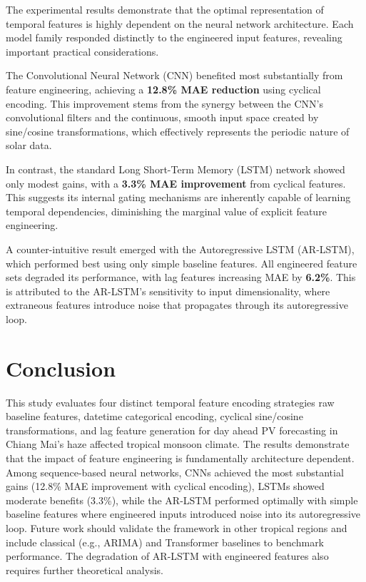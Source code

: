 \documentclass[conference]{IEEEtran}
\begin{document}
The experimental results demonstrate that the optimal representation of temporal features is highly dependent on the neural network architecture. Each model family responded distinctly to the engineered input features, revealing important practical considerations.

The Convolutional Neural Network (CNN) benefited most substantially from feature engineering, achieving a \textbf{12.8\% MAE reduction} using cyclical encoding. This improvement stems from the synergy between the CNN's convolutional filters and the continuous, smooth input space created by sine/cosine transformations, which effectively represents the periodic nature of solar data.

In contrast, the standard Long Short-Term Memory (LSTM) network showed only modest gains, with a \textbf{3.3\% MAE improvement} from cyclical features. This suggests its internal gating mechanisms are inherently capable of learning temporal dependencies, diminishing the marginal value of explicit feature engineering.

A counter-intuitive result emerged with the Autoregressive LSTM (AR-LSTM), which performed best using only simple baseline features. All engineered feature sets degraded its performance, with lag features increasing MAE by \textbf{6.2\%}. This is attributed to the AR-LSTM's sensitivity to input dimensionality, where extraneous features introduce noise that propagates through its autoregressive loop.

\section{Conclusion}

This study evaluates four distinct temporal feature encoding strategies raw baseline features, datetime categorical encoding, cyclical sine/cosine transformations, and lag feature generation for day ahead PV forecasting in Chiang Mai’s haze affected tropical monsoon climate. The results demonstrate that the impact of feature engineering is fundamentally architecture dependent. Among sequence-based neural networks, CNNs achieved the most substantial gains (12.8\% MAE improvement with cyclical encoding), LSTMs showed moderate benefits (3.3\%), while the AR-LSTM performed optimally with simple baseline features where engineered inputs introduced noise into its autoregressive loop. Future work should validate the framework in other tropical regions and include classical (e.g., ARIMA) and Transformer baselines to benchmark performance. The degradation of AR-LSTM with engineered features also requires further theoretical analysis.






\vspace{12pt}
\end{document}

